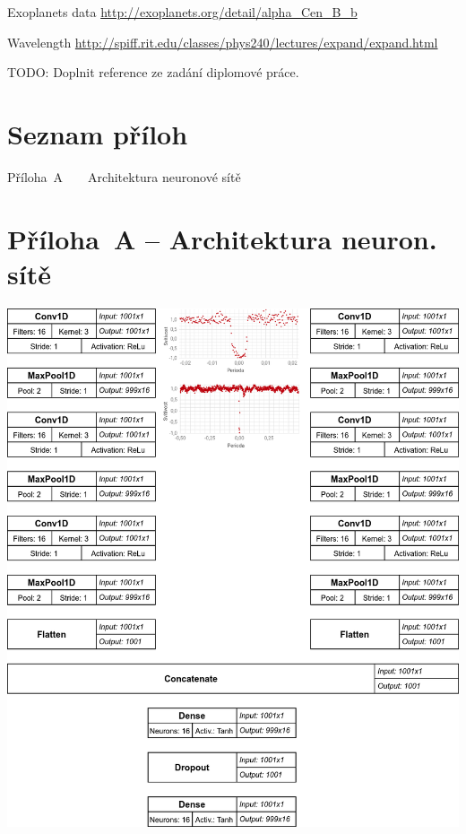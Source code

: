 \documentclass[a4paper,12pt]{article}
\begin{document}
{{{{{{{\begin{thebibliography}{99}



\end{thebibliography}

Exoplanets data \url{http://exoplanets.org/detail/alpha_Cen_B_b}

Wavelength \url{http://spiff.rit.edu/classes/phys240/lectures/expand/expand.html}

TODO: Doplnit reference ze zadání diplomové práce.

\clearpage\pagestyle{plain}
\section*{Seznam příloh}

\noindent Příloha~A~~~~Architektura neuronové sítě \dotfill \pageref{priloha_a}

\section*{Příloha~A -- Architektura neuron. sítě}\label{priloha_a}
\includegraphics[width=\linewidth]{img/lc_cnn.png}

}}}}}}}
\end{document}
